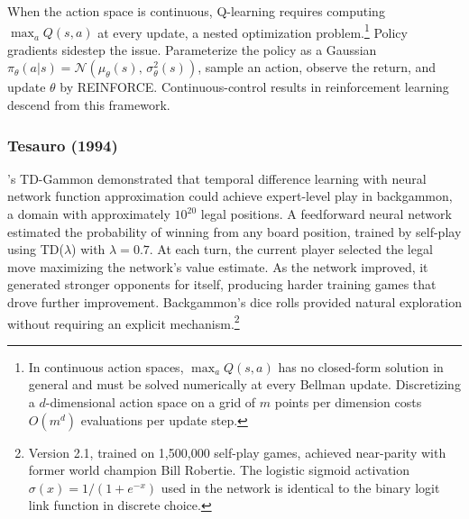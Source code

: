 When the action space is continuous, Q-learning requires computing $\max_a Q(s,a)$ at every update, a nested optimization problem.\footnote{In continuous action spaces, $\max_a Q(s,a)$ has no closed-form solution in general and must be solved numerically at every Bellman update. Discretizing a $d$-dimensional action space on a grid of $m$ points per dimension costs $O(m^d)$ evaluations per update step.} Policy gradients sidestep the issue. Parameterize the policy as a Gaussian $\pi_\theta(a|s) = \mathcal{N}(\mu_\theta(s),\, \sigma_\theta^2(s))$, sample an action, observe the return, and update $\theta$ by REINFORCE. Continuous-control results in reinforcement learning descend from this framework.


\subsubsection{Tesauro (1994)}

\citet{tesauro1994}'s TD-Gammon demonstrated that temporal difference learning with neural network function approximation could achieve expert-level play in backgammon, a domain with approximately $10^{20}$ legal positions. A feedforward neural network estimated the probability of winning from any board position, trained by self-play using TD($\lambda$) with $\lambda = 0.7$. At each turn, the current player selected the legal move maximizing the network's value estimate. As the network improved, it generated stronger opponents for itself, producing harder training games that drove further improvement. Backgammon's dice rolls provided natural exploration without requiring an explicit mechanism.\footnote{Version 2.1, trained on 1,500,000 self-play games, achieved near-parity with former world champion Bill Robertie. The logistic sigmoid activation $\sigma(x) = 1/(1+e^{-x})$ used in the network is identical to the binary logit link function in discrete choice.}

